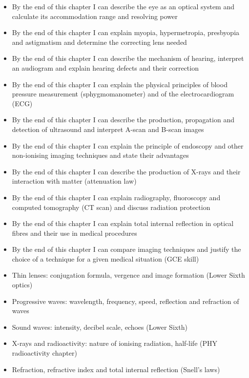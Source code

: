 \documentclass[11pt]{article}
\begin{document}
\begin{objectifs}
\begin{itemize}
\item By the end of this chapter I can describe the eye as an optical system and calculate its accommodation range and resolving power
\item By the end of this chapter I can explain myopia, hypermetropia, presbyopia and astigmatism and determine the correcting lens needed
\item By the end of this chapter I can describe the mechanism of hearing, interpret an audiogram and explain hearing defects and their correction
\item By the end of this chapter I can explain the physical principles of blood pressure measurement (sphygmomanometer) and of the electrocardiogram (ECG)
\item By the end of this chapter I can describe the production, propagation and detection of ultrasound and interpret A-scan and B-scan images
\item By the end of this chapter I can explain the principle of endoscopy and other non-ionising imaging techniques and state their advantages
\item By the end of this chapter I can describe the production of X-rays and their interaction with matter (attenuation law)
\item By the end of this chapter I can explain radiography, fluoroscopy and computed tomography (CT scan) and discuss radiation protection
\item By the end of this chapter I can explain total internal reflection in optical fibres and their use in medical procedures
\item By the end of this chapter I can compare imaging techniques and justify the choice of a technique for a given medical situation (GCE skill)
\end{itemize}
\end{objectifs}

\begin{prerequis}
\begin{itemize}
\item Thin lenses: conjugation formula, vergence and image formation (Lower Sixth optics)
\item Progressive waves: wavelength, frequency, speed, reflection and refraction of waves
\item Sound waves: intensity, decibel scale, echoes (Lower Sixth)
\item X-rays and radioactivity: nature of ionising radiation, half-life (PHY radioactivity chapter)
\item Refraction, refractive index and total internal reflection (Snell's laws)
\end{itemize}
\end{prerequis}
\end{document}
